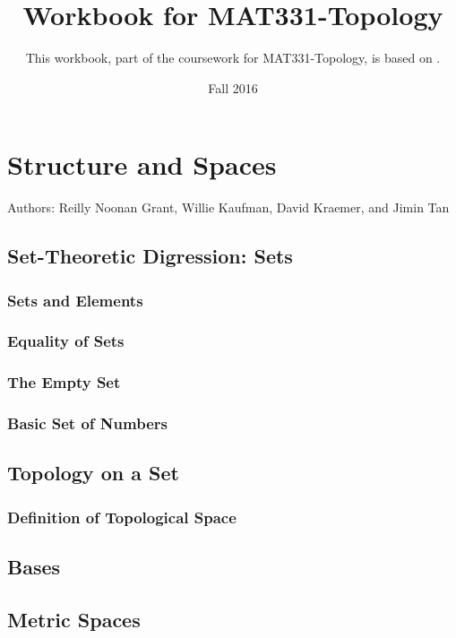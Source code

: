 \documentclass{book}
\title{Workbook for MAT331-Topology}
\date{Fall 2016}
\author{This workbook, part of the coursework for MAT331-Topology, is based on \cite{viro}.}
\begin{document}


\chapter{Structure and Spaces}
Authors: Reilly Noonan Grant, Willie Kaufman, David Kraemer, and Jimin Tan

\section{Set-Theoretic Digression: Sets}
\subsection{Sets and Elements}%
\subsection{Equality of Sets}%
\subsection{The Empty Set}%
\subsection{Basic Set of Numbers}%










\section{Topology on a Set}

\subsection{Definition of Topological Space}















\section{Bases}







\section{Metric Spaces} 
 



\end{document}
